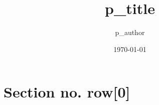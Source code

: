 \documentclass{beamer}
\begin{document}
\title{ {{ p_title }} }
\author{ {{ p_author }} }
\date{\today} 

\frame{\titlepage} 


\section{Section no. {{ row[0] }} } 
\end{document}
